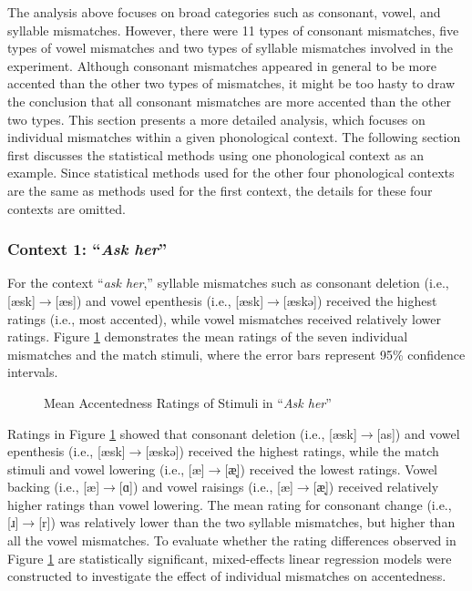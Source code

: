 The analysis above focuses on broad categories such as consonant, vowel, and syllable mismatches. However, there were 11 types of consonant mismatches, five types of vowel mismatches and two types of syllable mismatches involved in the experiment. Although consonant mismatches appeared in general to be more accented than the other two types of mismatches, it might be too hasty to draw the conclusion that all consonant mismatches are more accented than the other two types. This section presents a more detailed analysis, which focuses on individual mismatches within a given phonological context. The following section first discusses the statistical methods using one phonological context as an example. Since statistical methods used for the other four phonological contexts are the same as methods used for the first context, the details for these four contexts are omitted. 

\subsubsection{Context 1: “\textit{Ask her}”}

For the context “\textit{ask her},” syllable mismatches such as consonant deletion (i.e., [æsk]$\rightarrow$[æs]) and vowel epenthesis (i.e., [æsk]$\rightarrow$[æskə]) received the highest ratings (i.e., most accented), while vowel mismatches received relatively lower ratings. Figure \ref{fig:ah2} demonstrates the mean ratings of the seven individual mismatches and the match stimuli, where the error bars represent 95\% confidence intervals. 

\begin{figure}[!h]
  \figSpace
\centering

\caption{Mean Accentedness Ratings of Stimuli in “\textit{Ask her}”}
\label{fig:ah2}
\figSpace
\end{figure}

Ratings in Figure \ref{fig:ah2} showed that consonant deletion (i.e., [æsk]$\rightarrow$[as]) and vowel epenthesis (i.e., [æsk]$\rightarrow$[æskə]) received the highest ratings, while the match stimuli and vowel lowering (i.e., [æ]$\rightarrow$[æ̞]) received the lowest ratings. Vowel backing (i.e., [æ]$\rightarrow$[ɑ]) and vowel raisings (i.e., [æ]$\rightarrow$[æ̝]) received relatively higher ratings than vowel lowering. The mean rating for consonant change (i.e., [ɹ]$\rightarrow$[r]) was relatively lower than the two syllable mismatches, but higher than all the vowel mismatches. To evaluate whether the rating differences observed in Figure \ref{fig:ah2} are statistically significant, mixed-effects linear regression models were constructed to investigate the effect of individual mismatches on accentedness.

